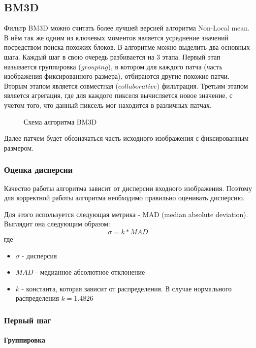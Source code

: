 \subsection{BM3D}
Фильтр BM3D можно считать более лучшей версией алгоритма Non-Local mean. В нём так же одним из ключевых моментов является
усреднение значений посредством поиска похожих блоков. В алгоритме можно выделить два основных шага. Каждый шаг в свою очередь разбивается на 3 этапа. Первый этап называется группировка ($grouping$), в котором для каждого патча (часть изображения фиксированного размера), отбираются другие похожие патчи. Вторым этапом является совместная ($collaborative$) фильтрация. Третьим этапом является агрегация, где для каждого пикселя вычисляется новое значение, с учетом того, что данный пиксель мог находится в различных патчах\cite{Hasan2018}.
\begin{figure}[H]
	\caption{Схема алгоритма BM3D\cite{bm3dCircuit}}
\end{figure}
Далее патчем будет обозначаться часть исходного изображения с фиксированным размером.
\subsubsection{Оценка дисперсии}
Качество работы алгоритма зависит от дисперсии входного изображения. Поэтому для корректной работы алгоритма необходимо правильно оценивать дисперсию.

Для этого используется следующая метрика - MAD (median absolute deviation)\cite{mad}. Выглядит она следующим образом:
\begin{equation}
	\sigma = k * MAD
\end{equation}
где
\begin{itemize}
	\item $\sigma$ - дисперсия
	\item $MAD$ - медианное абсолютное отклонение
	\item $k$ - константа, которая зависит от распределения. В случае нормального распределения $k=1.4826$%
	
\end{itemize}
\subsubsection{Первый шаг}
\paragraph{Группировка}\

